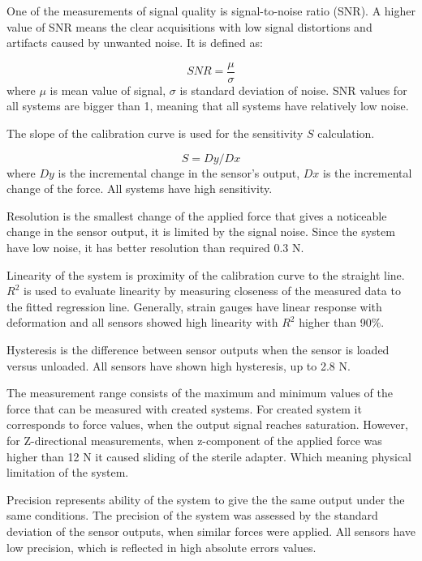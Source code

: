 One of the measurements of signal quality is signal-to-noise ratio (SNR). A higher value of SNR means the clear acquisitions with low signal distortions and artifacts caused by unwanted noise. It is defined as:

\begin{equation}
SNR=\frac{\mu}{\sigma}
\end{equation}
where $\mu$ is mean value of signal, $\sigma$ is standard deviation of noise. SNR values for all systems are bigger than 1, meaning that all systems have relatively low noise.

The slope of the calibration curve is used for the sensitivity $S$ calculation.

\begin{equation}
S = Dy/Dx
\end{equation}
where $Dy$ is the incremental change in the sensor’s output, $Dx$ is the incremental change of the force. All systems have high sensitivity.

Resolution is the smallest change of the applied force that gives a noticeable change in the sensor output, it is limited by the signal noise. Since the system have low noise, it has better resolution than required 0.3 N.

Linearity of the system is proximity of the calibration curve to the straight line. $R^2$ is used to evaluate linearity by measuring closeness of the measured data to the fitted regression line. Generally, strain gauges have linear response with deformation and all sensors showed high linearity with $R^2$ higher than 90\%.

Hysteresis is the difference between sensor outputs when the sensor is loaded versus unloaded. All sensors have shown high hysteresis, up to 2.8 N.

The measurement range consists of the maximum and minimum values of the force that can be measured with created systems. For created system it corresponds to force values, when the output signal reaches saturation. However, for Z-directional measurements, when z-component of the applied force was higher than 12 N it caused sliding of the sterile adapter. Which meaning physical limitation of the system.

Precision represents ability of the system to give the the same output under the same conditions. The precision of the system was assessed by the standard deviation of the sensor outputs, when similar forces were applied.  All sensors have low precision, which is reflected in high absolute errors values.

